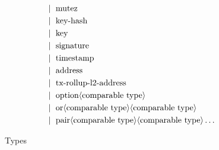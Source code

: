 \documentclass[runningheads]{llncs}
\begin{document}
\begin{figure} []
\begin{align*}
   &\mid\ \text{mutez}\\
   &\mid\ \text{key-hash}\\
   &\mid\ \text{key}\\
   &\mid\ \text{signature}\\
   &\mid\ \text{timestamp}\\
   &\mid\ \text{address}\\
   &\mid\ \text{tx-rollup-l2-address}\\
   &\mid\ \text{option} \langle\text{comparable type}\rangle\\
   &\mid\ \text{or} \langle\text{comparable type}\rangle \langle\text{comparable type}\rangle\\
   &\mid\ \text{pair} \langle\text{comparable type}\rangle \langle\text{comparable type}\rangle \dots \\
\end{align*}
\caption{Types}
\label{fig:type}
\end{figure}
\end{document}
